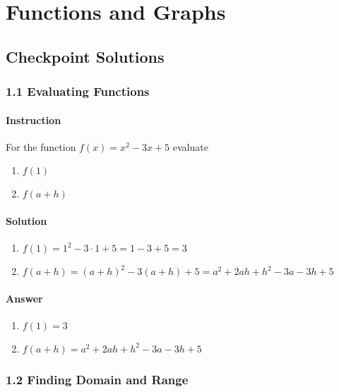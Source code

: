 \documentclass[12pt, letterpaper, oneside]{memoir}
\begin{document}
\chapter{Functions and Graphs}

\section*{Checkpoint Solutions}

\subsection*{1.1 Evaluating Functions}

\subsubsection*{Instruction}

For the function $ f(x) = x^2 - 3x + 5 $ evaluate

\begin{enumerate}[label=(\alph*)]
  \item $ f(1) $
  \item $ f(a + h) $
\end{enumerate}

\subsubsection*{Solution}

\begin{enumerate}[label=(\alph*)]
  \item $ f(1) = 1 ^ 2 - 3 \cdot 1 + 5 = 1 - 3 + 5 = 3 $
  \item $ f(a + h) = (a + h)^2 - 3(a + h) + 5 = a^2 + 2ah + h^2 - 3a - 3h + 5 $
\end{enumerate}

\subsubsection*{Answer}

\begin{enumerate}[label=(\alph*)]
  \item $ f(1) = 3 $
  \item $ f(a + h) = a^2 + 2ah + h^2 - 3a - 3h + 5 $
\end{enumerate}

\subsection*{1.2 Finding Domain and Range}
\end{document}
